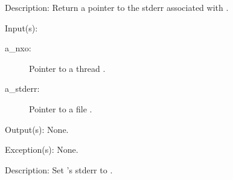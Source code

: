 \begin{capi}
\begin{capilist}
	\item[Description: ]
		Return a pointer to the stderr associated with .
	\end{capilist}
\label{nxo_thread_stderr_set}
	\begin{capilist}
	\item[Input(s): ]
		\begin{description}\item[]
		\item[a\_nxo: ]
			Pointer to a thread .
		\item[a\_stderr: ]
			Pointer to a file .
		\end{description}
	\item[Output(s): ] None.
	\item[Exception(s): ] None.
	\item[Description: ]
		Set 's stderr to .
	\end{capilist}
\end{capi}
